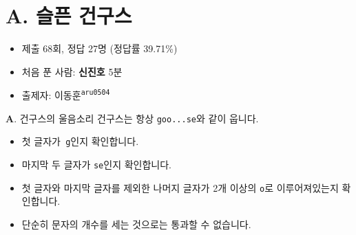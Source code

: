 \section{A. 슬픈 건구스}

\begin{frame} %
    \begin{itemize}
    	\item 제출 68회, 정답 27명 (정답률 39.71\%)
    	\item 처음 푼 사람: \textbf{신진호} 5분
        \item 출제자: 이동훈\textsuperscript{\color{kupc-gray}\texttt{aru0504}}
    \end{itemize}
\end{frame}

\begin{frame}{\textbf{A}. 건구스의 울음소리}
   건구스는 항상 \texttt{goo...se}와 같이 웁니다.
    \begin{itemize}
        \item 첫 글자가\texttt{ \color{kupc-green}g}인지 확인합니다.
        \item 마지막 두 글자가  \texttt{\color{kupc-green}se}인지 확인합니다.
        \item 첫 글자와 마지막 글자를 제외한 나머지 글자가 2개 이상의 \texttt{\color{kupc-green}o}로 이루어져있는지 확인합니다.
	\item 단순히 문자의 개수를 세는 것으로는 통과할 수 없습니다.
    \end{itemize}

\end{frame}